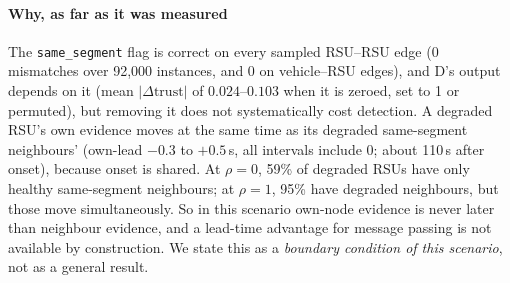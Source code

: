 \paragraph*{Why, as far as it was measured}
The \texttt{same\_segment} flag is correct on every sampled RSU--RSU edge (0 mismatches over 92,000 instances, and 0 on vehicle--RSU edges), and D's output depends on it (mean $|\Delta\text{trust}|$ of $0.024$--$0.103$ when it is zeroed, set to 1 or permuted), but removing it does not systematically cost detection.
A degraded RSU's own evidence moves at the same time as its degraded same-segment neighbours' (own-lead $-0.3$ to $+0.5$\,s, all intervals include $0$; about 110\,s after onset), because onset is shared.
At $\rho=0$, 59\% of degraded RSUs have only healthy same-segment neighbours; at $\rho=1$, 95\% have degraded neighbours, but those move simultaneously.
So in this scenario own-node evidence is never later than neighbour evidence, and a lead-time advantage for message passing is not available by construction.
We state this as a \emph{boundary condition of this scenario}, not as a general result.

